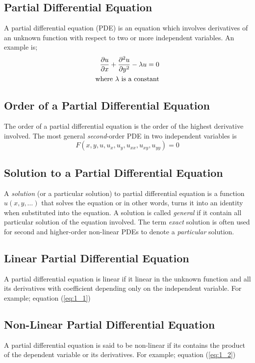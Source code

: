 \documentclass[11pt]{report}
\newcommand{\refn}[1]{(\ref{#1})}
\newcommand{\refx}[1]{\refn{eq:#1}}
\begin{document}
	\subsection{Partial Differential Equation}
	A partial differential equation (PDE) is an equation which involves derivatives of an unknown function with respect to two or more independent variables. An example is;
	\begin{eqnarray}
		\frac{\partial u}{\partial x} + \frac{\partial^2u}{\partial y^2} - \lambda u = 0\label{eq:3_6}\\
		\text{where }\lambda \text{ is a constant}\notag
	\end{eqnarray}

	\subsection{Order of a Partial Differential Equation}
	The order of a partial differential equation is the order of the highest derivative involved. The most general \textit{second}-order PDE in two independent variables is
	\begin{equation}
		F(x,y,u,u_x,u_y,u_{xx}, u_{xy}, u_{yy})=0
	\end{equation}

	\subsection{Solution to a Partial Differential Equation}
	A \textit{solution} (or a particular solution) to partial differential equation is a function $u(x,y,\ldots)$ that solves the equation or in other words, turns it into an identity when substituted into the equation. A solution is called \textit{general} if it contain all particular solution of the equation involved. The term \textit{exact} solution is often used for second and higher-order non-linear PDEs to denote a \textit{particular} solution.\\
	
	\subsection{Linear Partial Differential Equation}
	A partial differential equation is linear if it linear in the unknown function and all its derivatives with coefficient depending only on the independent variable. For example; equation \refx{1_1}
	
	\subsection{Non-Linear Partial Differential Equation}
	A partial differential equation is said to be non-linear if its contains the product of the dependent variable or its derivatives. For example; equation \refx{1_2}
	
\end{document}

